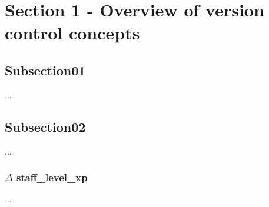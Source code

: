 \section{Section 1 - Overview of version control concepts}
    \subsection{Subsection01}
    ...

    \subsection{Subsection02}
    ...

    \subsubsection{$\Delta$ staff\_level\_xp}
    ...
